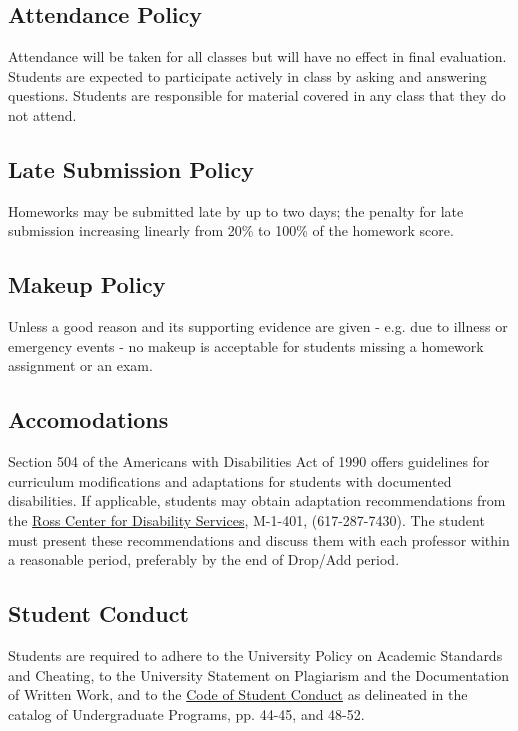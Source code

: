 \documentclass[12pt,letterpaper,twoside]{article}
\begin{document}
\subsection*{Attendance Policy}
Attendance will be taken for all classes but will have no effect in final evaluation.
Students are expected to participate actively in class by asking and answering questions.
Students are responsible for material covered in any class that they do not attend.

\subsection*{Late Submission Policy}
Homeworks may be submitted late by up to two days; the penalty for late submission increasing linearly from 20\% to 100\% of the homework score.

\subsection*{Makeup Policy}
Unless a good reason and its supporting evidence are given - e.g. due to illness or emergency events - no makeup is acceptable for students missing a homework assignment or an exam.

\subsection*{Accomodations}
Section 504 of the Americans with Disabilities Act of 1990 offers guidelines for curriculum modifications and adaptations for students with documented disabilities. If applicable, students may obtain adaptation recommendations from the \href{http://www.umb.edu/academics/vpass/disability}{Ross Center for Disability Services}, M-1-401, (617-287-7430). The student must present these recommendations and discuss them with each professor within a reasonable period, preferably by the end of Drop/Add period.

\subsection*{Student Conduct}
Students are required to adhere to the University Policy on Academic Standards and Cheating, to the University Statement on Plagiarism and the Documentation of Written Work, and to the \href{http://www.umb.edu/life_on_campus/policies/community/code}{Code of Student Conduct} as delineated in the catalog of Undergraduate Programs, pp. 44-45, and 48-52.
\end{document}
